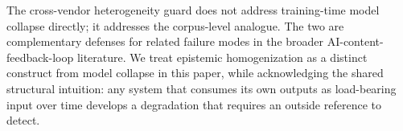 The cross-vendor heterogeneity guard does not address training-time model collapse directly; it addresses the corpus-level analogue. The two are complementary defenses for related failure modes in the broader AI-content-feedback-loop literature. We treat epistemic homogenization as a distinct construct from model collapse in this paper, while acknowledging the shared structural intuition: any system that consumes its own outputs as load-bearing input over time develops a degradation that requires an outside reference to detect.

